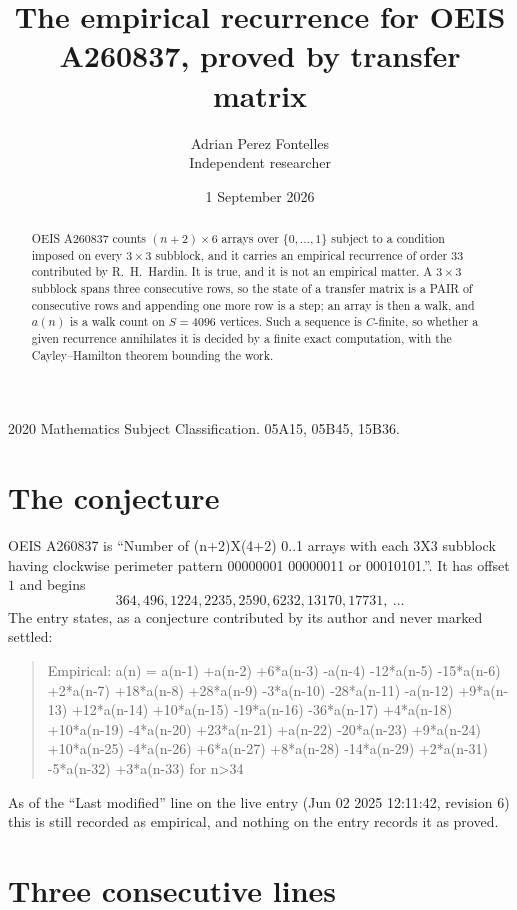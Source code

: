 \documentclass[11pt,a4paper]{article}
\title{The empirical recurrence for OEIS A260837, proved by transfer matrix}
\author{Adrian Perez Fontelles\\ \small Independent researcher}
\date{1 September 2026}
\theoremstyle{plain}
\theoremstyle{definition}
\begin{document}
\maketitle

\begin{abstract}
OEIS A260837 counts $(n+2)\times6$ arrays over $\{0,\dots,1\}$ subject to a condition imposed on
every $3\times3$ subblock, and it carries an empirical recurrence of order $33$
contributed by R.~H.~Hardin. It is true, and it is not an empirical matter. A $3\times3$
subblock spans three consecutive rows, so the state of a transfer matrix is a PAIR of
consecutive rows and appending one more row is a step; an array is then a walk, and
$a(n)$ is a walk count on $S=4096$ vertices. Such a sequence is $C$-finite, so whether a given
recurrence annihilates it is decided by a finite exact computation, with the Cayley--Hamilton
theorem bounding the work.
\end{abstract}

\noindent\small 2020 Mathematics Subject Classification. 05A15, 05B45, 15B36.\normalsize

\section{The conjecture}

OEIS A260837 is ``Number of (n+2)X(4+2) 0..1 arrays with each 3X3 subblock having clockwise perimeter pattern 00000001 00000011 or 00010101.''. It has offset $1$ and begins
\[
364, 496, 1224, 2235, 2590, 6232, 13170, 17731,\ \dots
\]
The entry states, as a conjecture contributed by its author and never marked settled:
\begin{quote}
Empirical: a(n) = a(n-1) +a(n-2) +6*a(n-3) -a(n-4) -12*a(n-5) -15*a(n-6) +2*a(n-7) +18*a(n-8) +28*a(n-9) -3*a(n-10) -28*a(n-11) -a(n-12) +9*a(n-13) +12*a(n-14) +10*a(n-15) -19*a(n-16) -36*a(n-17) +4*a(n-18) +10*a(n-19) -4*a(n-20) +23*a(n-21) +a(n-22) -20*a(n-23) +9*a(n-24) +10*a(n-25) -4*a(n-26) +6*a(n-27) +8*a(n-28) -14*a(n-29) +2*a(n-31) -5*a(n-32) +3*a(n-33) for n>34
\end{quote}
As of the ``Last modified'' line on the live entry (Jun 02 2025 12:11:42, revision 6) this is still
recorded as empirical, and nothing on the entry records it as proved.

\section{Three consecutive lines}
\end{document}
